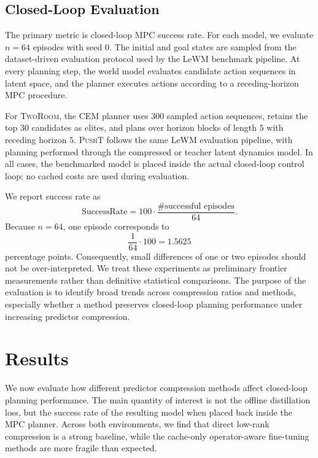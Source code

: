 \documentclass[11pt]{article}
\begin{document}
\subsection{Closed-Loop Evaluation}
\label{sec:closed_loop_eval}

The primary metric is closed-loop MPC success rate. For each model, we evaluate \(n=64\) episodes with seed \(0\). The initial and goal states are sampled from the dataset-driven evaluation protocol used by the LeWM benchmark pipeline. At every planning step, the world model evaluates candidate action sequences in latent space, and the planner executes actions according to a receding-horizon MPC procedure.

For \textsc{TwoRoom}, the CEM planner uses \(300\) sampled action sequences, retains the top \(30\) candidates as elites, and plans over horizon blocks of length \(5\) with receding horizon \(5\). \textsc{PushT} follows the same LeWM evaluation pipeline, with planning performed through the compressed or teacher latent dynamics model. In all cases, the benchmarked model is placed inside the actual closed-loop control loop; no cached costs are used during evaluation.

We report success rate as
\[
    \mathrm{SuccessRate}
    =
    100
    \cdot
    \frac{\#\text{successful episodes}}{64}.
\]
Because \(n=64\), one episode corresponds to
\[
    \frac{1}{64} \cdot 100 = 1.5625
\]
percentage points. Consequently, small differences of one or two episodes should not be over-interpreted. We treat these experiments as preliminary frontier measurements rather than definitive statistical comparisons. The purpose of the evaluation is to identify broad trends across compression ratios and methods, especially whether a method preserves closed-loop planning performance under increasing predictor compression.%

\section{Results}
\label{sec:results}

We now evaluate how different predictor compression methods affect closed-loop planning performance. The main quantity of interest is not the offline distillation loss, but the success rate of the resulting model when placed back inside the MPC planner. Across both environments, we find that direct low-rank compression is a strong baseline, while the cache-only operator-aware fine-tuning methods are more fragile than expected.
\end{document}
